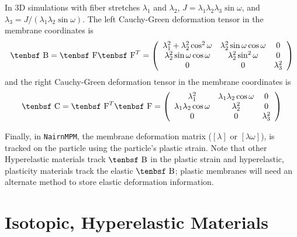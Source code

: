 \documentclass[11pt]{book}
\def\B{\hbox{\tenbsf B}}
\def\C{\hbox{\tenbsf C}}
\def\F{\hbox{\tenbsf F}}
\begin{document}
In 3D simulations with fiber stretches $\lambda_1$ and $\lambda_2$, $J=\lambda_1\lambda_2\lambda_3\sin\omega$, and $\lambda_3=J/(\lambda_1\lambda_2\sin\omega)$. The left Cauchy-Green deformation tensor in the membrane coordinates is
\begin{equation}
   \B = \F\F^T =  \left(\begin{array}{ccc}
          \lambda_1^2 + \lambda_2^2\cos^2\omega  & \lambda_2^2\sin\omega\cos\omega & 0   \\
         \lambda_2^2\sin\omega\cos\omega  & \lambda_2^2 \sin^2\omega & 0   \\
        0 & 0 & \lambda_3^2
        \end{array}\right)
\end{equation}
and the right Cauchy-Green deformation tensor in the membrane coordinates is
\begin{equation}
   \C = \F^T\F =  \left(\begin{array}{ccc}
          \lambda_1^2   & \lambda_1\lambda_2\cos\omega & 0   \\
         \lambda_1\lambda_2\cos\omega  & \lambda_2^2  & 0   \\
        0 & 0 & \lambda_3^2
        \end{array}\right)
\end{equation}

Finally, in {\tt NairnMPM}, the membrane deformation matrix ($[\lambda]$ or $[\lambda\omega]$), is tracked on the particle using the particle's plastic strain. Note that other Hyperelastic materials track $\B$ in the plastic strain and hyperelastic, plasticity materials track the elastic $\B$; plastic membranes will need an alternate method to store elastic deformation information.

\section{Isotopic, Hyperelastic Materials}
\end{document}
